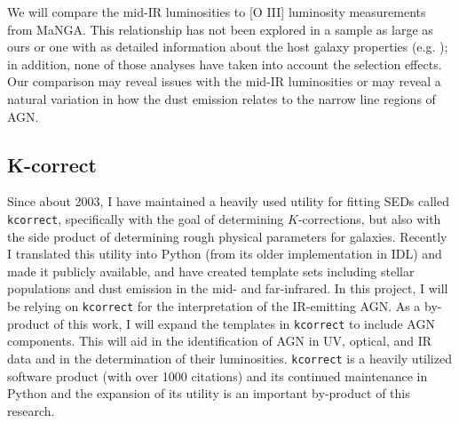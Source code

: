 \documentclass[12pt, preprint]{hacked-aastex}
\begin{document}
We will compare the mid-IR luminosities to [O III] luminosity
measurements from MaNGA. This relationship has not been explored in a
sample as large as ours or one with as detailed information about the
host galaxy properties (e.g. \cite{lamassa12a}); in addition, none of
those analyses have taken into account the selection effects. Our
comparison may reveal issues with the mid-IR luminosities or may
reveal a natural variation in how the dust emission relates to the
narrow line regions of AGN. 

\subsection{K-correct}

Since about 2003, I have maintained a heavily used utility for fitting
SEDs called {\tt kcorrect}, specifically with the goal of determining
$K$-corrections, but also with the side product of determining rough
physical parameters for galaxies. Recently I translated this utility
into Python (from its older implementation in IDL) and made it
publicly available, and have created template sets including stellar
populations and dust emission in the mid- and far-infrared.  In this
project, I will be relying on {\tt kcorrect} for the interpretation of
the IR-emitting AGN. As a by-product of this work, I will expand the
templates in {\tt kcorrect} to include AGN components. This will aid
in the identification of AGN in UV, optical, and IR data and in the
determination of their luminosities.  {\tt kcorrect} is a heavily
utilized software product (with over 1000 citations) and its continued
maintenance in Python and the expansion of its utility is an important
by-product of this research.
\end{document}
